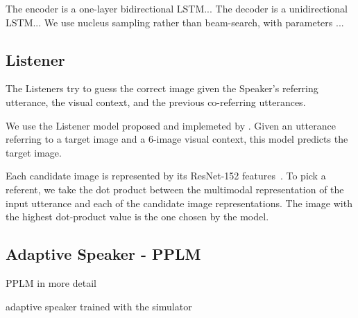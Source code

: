 The encoder is a one-layer bidirectional LSTM... The decoder is a unidirectional LSTM... We use nucleus sampling rather than beam-search, with parameters ...



\subsection{Listener}
\label{sec:listener}

The Listeners try to guess the correct image given the Speaker's referring utterance, the visual context, and the previous co-referring utterances.


We use the Listener model proposed and implemeted by \citet{takmaz-etal-2020-refer}. Given an utterance referring to a target image and a $6$-image visual context, this model predicts the target image.

Each candidate image is represented by its ResNet-152 features~\cite{resnet2016}. To pick a referent, we take the dot product between the multimodal representation of the input utterance and each of the candidate image representations. The image with the highest dot-product value is the one chosen by the model. 

\subsection{Adaptive Speaker - PPLM}
\label{sec:adapts}
PPLM in more detail

adaptive speaker trained with the simulator
